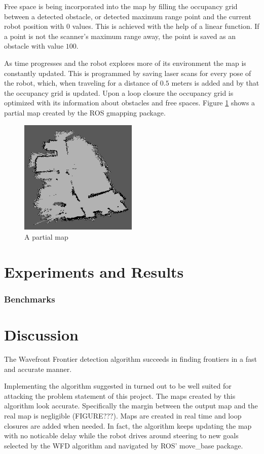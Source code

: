 \documentclass{ba-kecs}
\begin{document}
Free space is being incorporated into the map by filling the occupancy grid between a detected obstacle, or detected maximum range point and the current robot position with $0$ values. This is achieved with the help of a linear function. If a point is not the scanner's maximum range away, the point is saved as an obstacle with value $100$.

As time progresses and the robot explores more of its environment the map is constantly updated. This is programmed by saving laser scans for every pose of the robot, which, when traveling for a distance of $0.5$ meters is added and by that the occupancy grid is updated. Upon a loop closure the occupancy grid is optimized with its information about obstacles and free spaces.
Figure \ref{fig:random_map} shows a partial map created by the ROS gmapping package.
\begin{figure}[htbp]
	\centering
		\includegraphics[width=0.50\textwidth]{figures/random_map.png}
	\caption{A partial map}
	\label{fig:random_map}
\end{figure}

\section{Experiments and Results}
\subsubsection{Benchmarks}

\section{Discussion}
The Wavefront Frontier detection algorithm \citep{Keidar} succeeds in finding frontiers in a fast and accurate manner.

Implementing the algorithm suggested in \citep{Grisetti} turned out to be well suited for attacking the problem statement of this project. The maps created by this algorithm look accurate. Specifically the margin between the output map and the real map is negligible (FIGURE???). Maps are created in real time and loop closures are added when needed. In fact, the algorithm keeps updating the map with no noticable delay while the robot drives around steering to new goals selected by the WFD algorithm and navigated by ROS' move\_base package.
\end{document}
